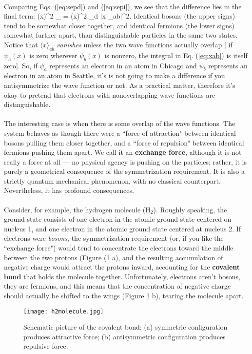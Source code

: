 \paragraph{}
Comparing Eqs. (\ref{eq:sepd}) and (\ref{eq:sepi}), we see that the difference lies in the final term:
\be
\langle (\Delta x)^2 \rangle_{\pm} = \langle (\Delta x)^2 \rangle_d |\langle x \rangle_{ab}|^2.
\ee
Identical bosons (the upper signs) tend to be somewhat closer together, and identical fermions (the lower signs) somewhat further apart, than distinguishable particles in the same two states.		 Notice that $\langle x \rangle_{ab}$ \textit{vanishes} unless the two wave functions actually overlap [ if $\psi_a(x)$ is zero wherever $\psi_b(x)$ is nonzero, the integral in 
Eq. (\ref{eq:xab})	is itself zero]. So, if $\psi_a$ represents an electron in an atom in Chicago and $\psi_b$ represents an
electron in an atom in Seattle, it's is not going to make a difference if you antisymmetrize the wave function or not. As 
a practical matter, therefore it's okay to pretend that electrons with nonoverlapping wave functions are distinguishable.

\paragraph{}
The interesting case is when there is some overlap of the wave functions. The system behaves as though there were a ``force
of attraction" between identical bosons pulling them closer together, and a ``force of repulsion" between identical fermions pushing them apart. We call it an {\bf exchange force}, although it is not really a force at all --- no physical agency is pushing on the particles; rather, it is purely a geometrical consequence of the symmetrization requirement. It is also a strictly quantum mechanical phenomenon, with no classical counterpart. Nevertheless, it has profound consequences. 

\paragraph{}
Consider, for example, the hydrogen molecule (H$_2$). Roughly speaking, the ground state consists of one electron in the atomic ground state centered on nucleus 1, and one electron in the atomic ground state centered at nucleus 2. If electrons were 
\textit{bosons}, the symmetrization requirement (or, if you like the ``exchange force") would tend to concentrate the electrons toward the middle between the two protons (Figure (\ref{fig:h2} a), and the resulting accumulation of negative charge would attract the protons inward, accounting for the {\bf covalent bond} that holds the molecule together. 
Unfortunately, electrons aren't bosons, they are fermions, and this means that the concentration of negative charge should
actually be shifted to the wings (Figure \ref{fig:h2} b), tearing the molecule apart.
\begin{figure}[t!]
	\centering
	\texttt{[image: h2molecule.jpg]}
	\caption{Schematic picture of the covalent bond: (a) symmetric configuration produces attractive force; (b) antisymmetric configuration produces repulsive force.}
	\label{fig:h2}
\end{figure}

